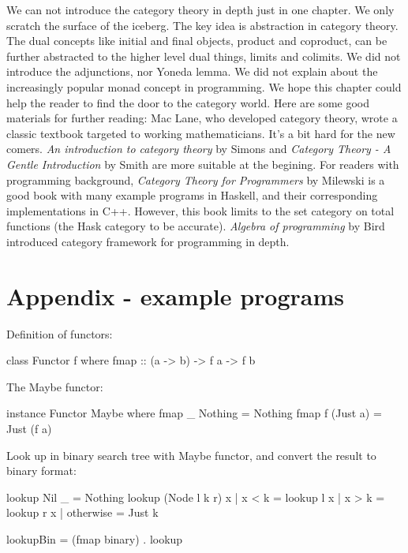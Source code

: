 \documentclass[b5paper]{article}
\begin{document}
We can not introduce the category theory in depth just in one chapter. We only scratch the surface of the iceberg. The key idea is abstraction in category theory. The dual concepts like initial and final objects, product and coproduct, can be further abstracted to the higher level dual things, limits and colimits. We did not introduce the adjunctions, nor Yoneda lemma. We did not explain about the increasingly popular monad concept in programming. We hope this chapter could help the reader to find the door to the category world. Here are some good materials for further reading: Mac Lane, who developed category theory, wrote a classic textbook\cite{Mac-Lane-1998} targeted to working mathematicians. It's a bit hard for the new comers. {\em An introduction to category theory} by Simons\cite{Simmons2011} and {\em Category Theory - A Gentle Introduction} by Smith are more suitable at the begining. For readers with programming background, {\em Category Theory for Programmers} by Milewski\cite{Milewski2018} is a good book with many example programs in Haskell, and their corresponding implementations in C++. However, this book limits to the set category on total functions (the Hask category to be accurate). {\em Algebra of programming} by Bird\cite{Bird97} introduced category framework for programming in depth.


\section{Appendix - example programs}

Definition of functors:

\begin{Haskell}
class  Functor f  where
    fmap        :: (a -> b) -> f a -> f b
\end{Haskell}

The Maybe functor:

\begin{Haskell}
instance  Functor Maybe  where
    fmap _ Nothing       = Nothing
    fmap f (Just a)      = Just (f a)
\end{Haskell}

Look up in binary search tree with Maybe functor, and convert the result to binary format:

\begin{Haskell}
lookup Nil _ = Nothing
lookup (Node l k r) x | x < k = lookup l x
                      | x > k = lookup r x
                      | otherwise = Just k

lookupBin = (fmap binary) . lookup
\end{Haskell}
\end{document}
